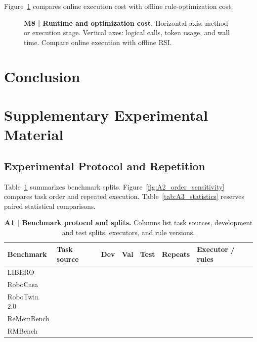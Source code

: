 Figure~\ref{fig:M8_cost_analysis} compares online
execution cost with offline rule-optimization cost.

\begin{figure}[t]
\centering
{}
\caption{\textbf{M8 | Runtime and optimization cost.}
Horizontal axis: method or execution stage.
Vertical axes: logical calls, token usage, and wall time.
Compare online execution with offline RSI.}
\label{fig:M8_cost_analysis}
\end{figure}



\FloatBarrier
\section{Conclusion}
\label{sec:conclusion}



\FloatBarrier
\appendix
\section{Supplementary Experimental Material}
\label{sec:appendix}

\subsection{Experimental Protocol and Repetition}

Table~\ref{tab:A1_protocol} summarizes benchmark splits.
Figure~\ref{fig:A2_order_sensitivity} compares task order
and repeated execution.
Table~\ref{tab:A3_statistics} reserves
paired statistical comparisons.

\begin{table}[t]
\centering
\caption{\textbf{A1 | Benchmark protocol and splits.}
Columns list task sources, development and test splits,
executors, and rule versions.}
\label{tab:A1_protocol}
\small
\setlength{\tabcolsep}{6pt}
\renewcommand{\arraystretch}{1.16}
\begin{tabular}{@{}llccccl@{}}
\toprule
\rowcolor{cvprblue!8}
\textbf{Benchmark}
& \textbf{Task source}
& \textbf{Dev}
& \textbf{Val}
& \textbf{Test}
& \textbf{Repeats}
& \textbf{Executor / rules} \\
\midrule
LIBERO & & & & & & \\
RoboCasa & & & & & & \\
RoboTwin 2.0 & & & & & & \\
\midrule
ReMemBench & & & & & & \\
RMBench & & & & & & \\
\bottomrule
\end{tabular}
\end{table}

